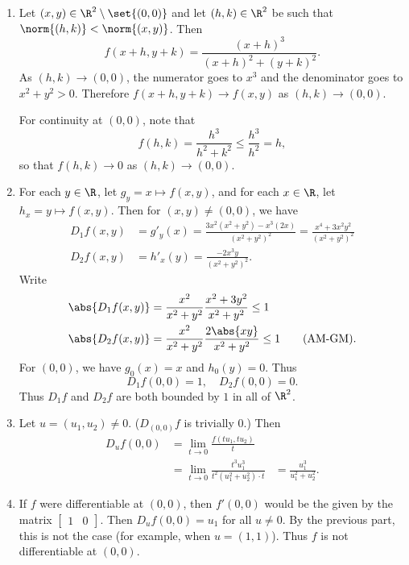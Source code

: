 \documentclass[12pt]{article}
\begin{document}
\begin{solution} \leavevmode
    \begin{enumerate}
        \item Let $(x, y) \in \R^2 \setminus \set{(0, 0)}$ and
        let $(h, k) \in \R^2$ be such that $\norm{(h, k)} < \norm{(x, y)}$.
        Then \[
            f(x + h, y + k) = \frac{(x + h)^3}{(x + h)^2 + (y + k)^2}.
        \] As $(h, k) \to (0, 0)$, the numerator goes to $x^3$ and the
        denominator goes to $x^2 + y^2 > 0$.
        Therefore $f(x + h, y + k) \to f(x, y)$ as $(h, k) \to (0, 0)$.

        For continuity at $(0, 0)$, note that \[
            f(h, k) = \frac{h^3}{h^2 + k^2} \le \frac{h^3}{h^2} = h,
        \] so that $f(h, k) \to 0$ as $(h, k) \to (0, 0)$.
        \item For each $y \in \R$, let $g_y = x \mapsto f(x, y)$, and for
        each $x \in \R$, let $h_x = y \mapsto f(x, y)$.
        Then for $(x, y) \ne (0, 0)$, we have \begin{align*}
            D_1f(x, y) &= g'_y(x)
                = \frac{3x^2(x^2 + y^2) - x^3(2x)}{(x^2 + y^2)^2}
                = \frac{x^4 + 3x^2y^2}{(x^2 + y^2)^2} \\
            D_2f(x, y) &= h'_x(y)
                = \frac{-2x^3y}{(x^2 + y^2)^2}.
        \end{align*}
        Write \begin{align*}
            \abs{D_1f(x, y)} &= \frac{x^2}{x^2 + y^2} \frac{x^2 + 3y^2}{x^2 + y^2}
                \le 1 \\
            \abs{D_2f(x, y)} &= \frac{x^2}{x^2 + y^2} \frac{2\abs{xy}}{x^2 + y^2}
                \le 1 \tag{AM-GM}.
        \end{align*}
        For $(0, 0)$, we have $g_0(x) = x$ and $h_0(y) = 0$.
        Thus \[
            D_1f(0, 0) = 1, \quad D_2f(0, 0) = 0.
        \] Thus $D_1f$ and $D_2f$ are both bounded by $1$ in all of $\R^2$.
        \item Let $u = (u_1, u_2) \ne 0$.
        ($D_{(0, 0)}f$ is trivially $0$.)
        Then \begin{align*}
            D_uf(0, 0) &= \lim_{t \to 0} \frac{f(tu_1, tu_2)}{t} \\
            &= \lim_{t \to 0} \frac{t^3u_1^3}{t^2(u_1^2 + u_2^2) \cdot t}
            &= \frac{u_1^3}{u_1^2 + u_2^2}.
        \end{align*}
        \item If $f$ were differentiable at $(0, 0)$, then $f'(0, 0)$ would
        be the given by the matrix $\begin{bmatrix} 1 & 0 \end{bmatrix}$.
        Then $D_uf(0, 0) = u_1$ for all $u \ne 0$.
        By the previous part, this is not the case (for example,
        when $u = (1, 1)$).
        Thus $f$ is not differentiable at $(0, 0)$. \qedhere
    \end{enumerate}
\end{solution}
\end{document}

